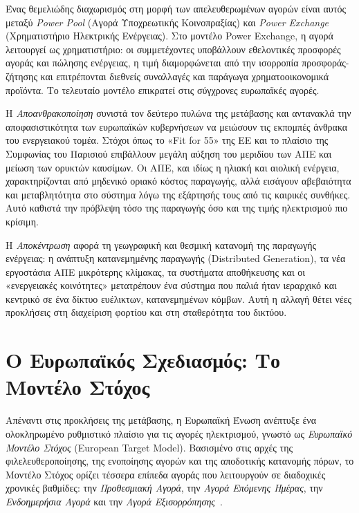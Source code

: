 Ένας θεμελιώδης διαχωρισμός στη μορφή των απελευθερωμένων αγορών είναι αυτός
μεταξύ \textit{Power Pool} (Αγορά Υποχρεωτικής Κοινοπραξίας) και \textit{Power Exchange}
(Χρηματιστήριο Ηλεκτρικής Ενέργειας). Στο μοντέλο Power Exchange, η αγορά λειτουργεί
ως χρηματιστήριο: οι συμμετέχοντες υποβάλλουν εθελοντικές προσφορές αγοράς και πώλησης
ενέργειας, η τιμή διαμορφώνεται από την ισορροπία προσφοράς-ζήτησης και επιτρέπονται
διεθνείς συναλλαγές και παράγωγα χρηματοοικονομικά προϊόντα. Το τελευταίο μοντέλο
επικρατεί στις σύγχρονες ευρωπαϊκές αγορές.

Η \textit{Αποανθρακοποίηση} συνιστά τον δεύτερο πυλώνα της μετάβασης και αντανακλά
την αποφασιστικότητα των ευρωπαϊκών κυβερνήσεων να μειώσουν τις εκπομπές άνθρακα
του ενεργειακού τομέα. Στόχοι όπως το «Fit for 55» της ΕΕ και το πλαίσιο της Συμφωνίας
του Παρισιού επιβάλλουν μεγάλη αύξηση του μεριδίου των ΑΠΕ και μείωση των ορυκτών
καυσίμων. Οι ΑΠΕ, και ιδίως η ηλιακή και αιολική ενέργεια, χαρακτηρίζονται από
μηδενικό οριακό κόστος παραγωγής, αλλά εισάγουν αβεβαιότητα και μεταβλητότητα στο
σύστημα λόγω της εξάρτησής τους από τις καιρικές συνθήκες. Αυτό καθιστά την πρόβλεψη
τόσο της παραγωγής όσο και της τιμής ηλεκτρισμού πιο κρίσιμη.

Η \textit{Αποκέντρωση} αφορά τη γεωγραφική και θεσμική κατανομή της παραγωγής
ενέργειας: η ανάπτυξη κατανεμημένης παραγωγής (Distributed Generation), τα νέα
εργοστάσια ΑΠΕ μικρότερης κλίμακας, τα συστήματα αποθήκευσης και οι «ενεργειακές
κοινότητες» μετατρέπουν ένα σύστημα που παλιά ήταν ιεραρχικό και κεντρικό σε ένα
δίκτυο ευέλικτων, κατανεμημένων κόμβων. Αυτή η αλλαγή θέτει νέες προκλήσεις
στη διαχείριση φορτίου και στη σταθερότητα του δικτύου.


\section{Ο Ευρωπαϊκός Σχεδιασμός: Το Μοντέλο Στόχος}
\label{sec:target_model}

Απέναντι στις προκλήσεις της μετάβασης, η Ευρωπαϊκή Ένωση ανέπτυξε ένα ολοκληρωμένο
ρυθμιστικό πλαίσιο για τις αγορές ηλεκτρισμού, γνωστό ως \textit{Ευρωπαϊκό Μοντέλο
Στόχος} (European Target Model). Βασισμένο στις αρχές της φιλελευθεροποίησης, της
ενοποίησης αγορών και της αποδοτικής κατανομής πόρων, το Μοντέλο Στόχος ορίζει
τέσσερα επίπεδα αγοράς που λειτουργούν σε διαδοχικές χρονικές βαθμίδες: την
\textit{Προθεσμιακή Αγορά}, την \textit{Αγορά Επόμενης Ημέρας}, την \textit{Ενδοημερήσια
Αγορά} και την \textit{Αγορά Εξισορρόπησης}~\cite{cacm2015}.

